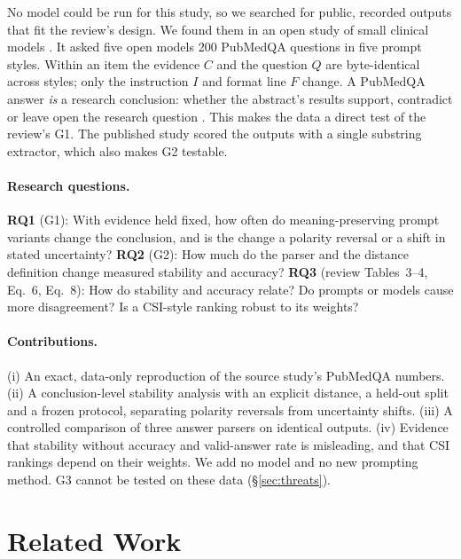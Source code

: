\documentclass[acmsmall]{acmart}
\begin{document}
No model could be run for this study, so we searched for public, recorded outputs that fit the review's design. We found them in an open study of small clinical models \cite{hariprasad2026clinical}. It asked five open models 200 PubMedQA questions \cite{jin2019pubmedqa} in five prompt styles. Within an item the evidence $C$ and the question $Q$ are byte-identical across styles; only the instruction $I$ and format line $F$ change. A PubMedQA answer \emph{is} a research conclusion: whether the abstract's results support, contradict or leave open the research question \cite{jin2019pubmedqa}. This makes the data a direct test of the review's G1. The published study scored the outputs with a single substring extractor, which also makes G2 testable.

\paragraph{Research questions.}
\textbf{RQ1} (G1): With evidence held fixed, how often do meaning-preserving prompt variants change the conclusion, and is the change a polarity reversal or a shift in stated uncertainty?
\textbf{RQ2} (G2): How much do the parser and the distance definition change measured stability and accuracy?
\textbf{RQ3} (review Tables~3--4, Eq.~6, Eq.~8): How do stability and accuracy relate? Do prompts or models cause more disagreement? Is a CSI-style ranking robust to its weights?

\paragraph{Contributions.} (i) An exact, data-only reproduction of the source study's PubMedQA numbers. (ii) A conclusion-level stability analysis with an explicit distance, a held-out split and a frozen protocol, separating polarity reversals from uncertainty shifts. (iii) A controlled comparison of three answer parsers on identical outputs. (iv) Evidence that stability without accuracy and valid-answer rate is misleading, and that CSI rankings depend on their weights. We add no model and no new prompting method. G3 cannot be tested on these data (\S\ref{sec:threats}).

\section{Related Work}\label{sec:related}
\end{document}
